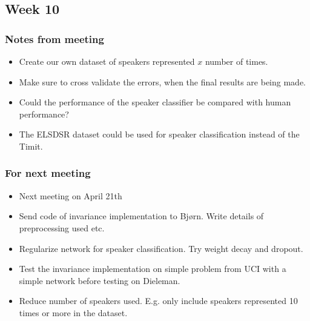 
\subsection{Week 10}

\subsubsection{Notes from meeting}

\begin{itemize}
\item Create our own dataset of speakers represented $x$ number of times.
\item Make sure to cross validate the errors, when the final results are being made.
\item Could the performance of the speaker classifier be compared with human
performance?
\item The ELSDSR dataset could be used for speaker classification instead of the Timit.
\end{itemize}

\subsubsection{For next meeting}

\begin{itemize}
\item Next meeting on April 21th
\item Send code of invariance implementation to Bjørn. Write details of preprocessing used etc.
\item Regularize network for speaker classification. Try weight decay and dropout.
\item Test the invariance implementation on simple problem from UCI with a simple network before testing on Dieleman.
\item Reduce number of speakers used. E.g. only include speakers represented 10 times or more in the dataset.
\end{itemize}
